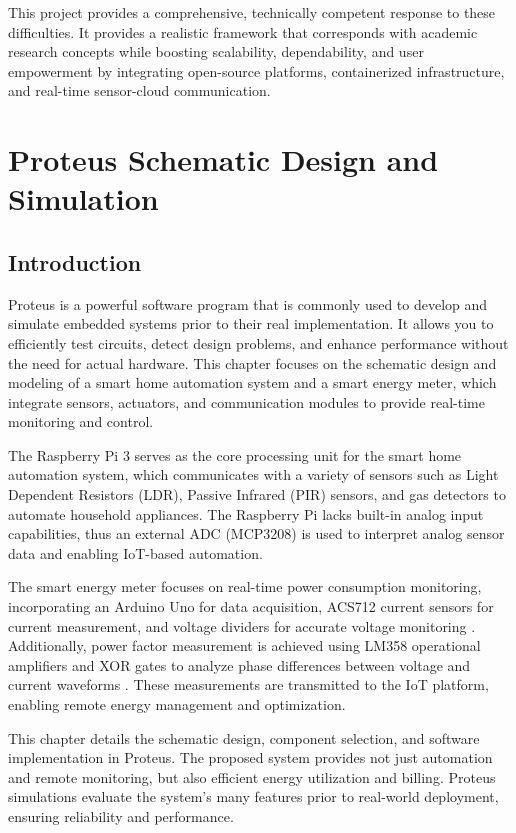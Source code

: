 \documentclass[a4paper,12pt]{report}
\begin{document}
This project provides a comprehensive, technically competent response to these difficulties.  It provides a realistic framework that corresponds with academic research concepts while boosting scalability, dependability, and user empowerment by integrating open-source platforms, containerized infrastructure, and real-time sensor-cloud communication.

\chapter{Proteus Schematic Design and Simulation}

\section{Introduction}
Proteus is a powerful software program that is commonly used to develop and simulate embedded systems prior to their real implementation.  It allows you to efficiently test circuits, detect design problems, and enhance performance without the need for actual hardware.  This chapter focuses on the schematic design and modeling of a smart home automation system and a smart energy meter, which integrate sensors, actuators, and communication modules to provide real-time monitoring and control.


The Raspberry Pi 3 serves as the core processing unit for the smart home automation system, which communicates with a variety of sensors such as Light Dependent Resistors (LDR), Passive Infrared (PIR) sensors, and gas detectors to automate household appliances.  The Raspberry Pi lacks built-in analog input capabilities, thus an external ADC (MCP3208) is used to interpret analog sensor data and enabling IoT-based automation\cite{valov2020home}.

The smart energy meter focuses on real-time power consumption monitoring, incorporating an Arduino Uno for data acquisition, ACS712 current sensors for current measurement, and voltage dividers for accurate voltage monitoring \cite{li2010application}. Additionally, power factor measurement is achieved using LM358 operational amplifiers and XOR gates to analyze phase differences between voltage and current waveforms \cite{Khair_2017}. These measurements are transmitted to the IoT platform, enabling remote energy management and optimization.

This chapter details the schematic design, component selection, and software implementation in Proteus.  The proposed system provides not just automation and remote monitoring, but also efficient energy utilization and billing.  Proteus simulations evaluate the system's many features prior to real-world deployment, ensuring reliability and performance.
\end{document}
